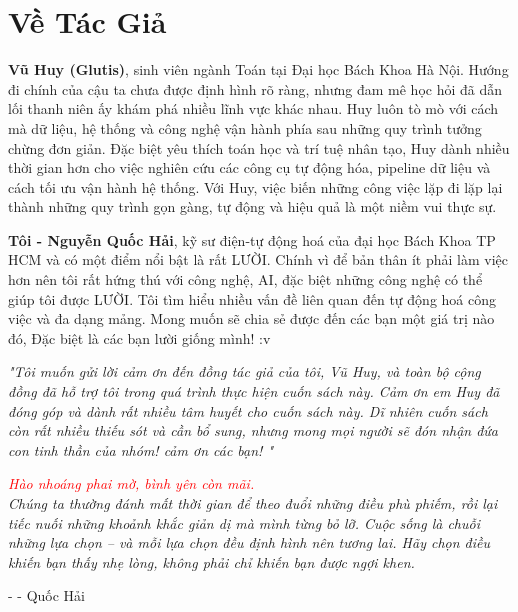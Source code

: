 \documentclass[a4paper,12pt,oneside]{book}
\begin{document}
\section*{Về Tác Giả}

\textbf{Vũ Huy (Glutis)}, sinh viên ngành Toán tại Đại học Bách Khoa Hà Nội. Hướng đi chính của cậu ta chưa được định hình rõ ràng, nhưng đam mê học hỏi đã dẫn lối thanh niên ấy khám phá nhiều lĩnh vực khác nhau. Huy luôn tò mò với cách mà dữ liệu, hệ thống và công nghệ vận hành phía sau những quy trình tưởng chừng đơn giản. Đặc biệt yêu thích toán học và trí tuệ nhân tạo, Huy dành nhiều thời gian hơn cho việc nghiên cứu các công cụ tự động hóa, pipeline dữ liệu và cách tối ưu vận hành hệ thống. Với Huy, việc biến những công việc lặp đi lặp lại thành những quy trình gọn gàng, tự động và hiệu quả là một niềm vui thực sự.

\vspace{0.5cm}

\textbf{Tôi - Nguyễn Quốc Hải}, kỹ sư điện-tự động hoá của đại học Bách Khoa TP HCM và có một điểm nổi bật là rất LƯỜI. Chính vì để bản thân ít phải làm việc hơn nên tôi rất hứng thú với công nghệ, AI, đặc biệt những công nghệ có thể giúp tôi được LƯỜI. Tôi tìm hiểu nhiều vấn đề liên quan đến tự động hoá công việc và đa dạng mảng. Mong muốn sẽ chia sẻ được đến các bạn một giá trị nào đó, Đặc biệt là các bạn lười giống mình! :v 

\textit{"Tôi muốn gửi lời cảm ơn đến đồng tác giả của tôi, Vũ Huy, và toàn bộ cộng đồng đã hỗ trợ tôi trong quá trình thực hiện cuốn sách này. Cảm ơn em Huy đã đóng góp và dành rất nhiều tâm huyết cho cuốn sách này. Dĩ nhiên cuốn sách còn rất nhiều thiếu sót và cần bổ sung, nhưng mong mọi người sẽ đón nhận đứa con tinh thần của nhóm! cảm ơn các bạn! "}


\newpage

\noindent\vspace{5cm}

\begin{center}
    \textit{ \textcolor{red}{Hào nhoáng phai mờ, bình yên còn mãi.}\\
    Chúng ta thường đánh mất thời gian để theo đuổi những điều phù phiếm, rồi lại tiếc nuối những khoảnh khắc giản dị mà mình từng bỏ lỡ. Cuộc sống là chuỗi những lựa chọn – và mỗi lựa chọn đều định hình nên tương lai. Hãy chọn điều khiến bạn thấy nhẹ lòng, không phải chỉ khiến bạn được ngợi khen.}
    
    \vspace{0.5cm}
    \hspace{10cm}
    - - Quốc Hải 
\end{center}
\end{document}
